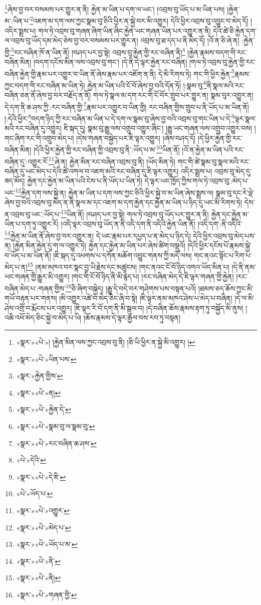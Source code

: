 \footnote{«སྣར་»«པེ་»། །རྐྱེན་མིན་ལས་ཀྱང་འབྲས་བུ་ནི། །ཅི་ཡི་ཕྱིར་ན་སྐྱེ་མི་འགྱུར། །}ཞེས་བྱ་བར་བསམས་པར་གྱུར་ན་ནི། རྐྱེན་མ་ཡིན་པ་དག་ལ་ཡང་། །འབྲས་བུ་ཡོད་པ་མ་ཡིན་པས། །རྐྱེན་མ་:ཡིན་པ་\footnote{«སྣར་»«པེ་»ཡིན་པས་}འཇག་མ་དག་ལས་ཀྱང་སྣམ་བུ་ཅིའི་ཕྱིར་ན་སྐྱེ་བར་མི་འགྱུར། དེའི་ཕྱིར་འབྲས་བུ་འབྱུང་བ་མེད་དོ། །འདིར་སྨྲས་པ། གལ་ཏེ་འབྲས་བུ་གཞན་ཞིག་ཡིན་ཞིང་རྐྱེན་ཡང་གཞན་ཡིན་པར་འགྱུར་ན་ནི། དེའི་ཚེ་ཅི་རྐྱེན་དག་ལ་འབྲས་བུ་ཡོད་དམ་མེད་ཅེས་བྱ་བར་བསམས་པར་གྱུར་ན། འབྲས་བུ་ཐ་དད་པ་ནི་མེད་དོ། །འོ་ན་ཅི་ཞེ་ན། :རྐྱེན་གྱི་\footnote{«སྣར་»རྐྱེན་གྱིས་}རང་བཞིན་ཁོ་ན་ཡིན་ནོ། །བཤད་པར་བྱ་སྟེ། འབྲས་བུ་རྐྱེན་གྱི་རང་བཞིན་ནི།\footnote{«སྣར་»«པེ་»ན།} །རྐྱེན་རྣམས་བདག་གི་རང་བཞིན་མིན། །བདག་དངོས་མིན་ལས་འབྲས་བུ་གང་། །དེ་ནི་དེ་ལྟར་རྐྱེན་རང་བཞིན། །གལ་ཏེ་འབྲས་བུ་རྐྱེན་གྱི་རང་བཞིན་རྐྱེན་གྱི་རྣམ་པར་འགྱུར་བ་ཡིན་ནོ་ཞེས་རྣམ་པར་འཇོག་ན་ནི། དེ་མི་རིགས་ཏེ། གང་གི་ཕྱིར་རྐྱེན་\footnote{«སྣར་»«པེ་»རྐྱེན་དེ་}རྣམས་ཀྱང་བདག་གི་རང་བཞིན་མ་ཡིན་ཏེ། རྐྱེན་མ་ཡིན་པའི་ངོ་བོ་ཞེས་བྱ་བའི་དོན་ཏོ། །:སྣམ་བུ་\footnote{«སྣར་»«པེ་»སྣམ་བུ་ལ་སྣམ་བུ་}ནི་སྣལ་མའི་རང་བཞིན་ཅན་ནོ་ཞེས་བྱ་བར་བརྗོད་ན་ནི། གལ་ཏེ་སྣལ་མ་དག་རང་གི་ངོ་བོར་གྲུབ་པར་གྱུར་ན། སྣམ་བུར་འགྱུར་ན། དེ་དག་ནི་ཆ་ཤས་ཀྱི་:རང་བཞིན་གྱི་\footnote{«སྣར་»«པེ་»རང་བཞིན་ཆ་ཤས་}རྣམ་པར་འགྱུར་བ་ཡིན་གྱི། རང་བཞིན་གྱིས་གྲུབ་པ་ནི་ཡོད་པ་མ་ཡིན་ནོ། །:དེའི་ཕྱིར་\footnote{«པེ་»དེའི་}བདག་ཉིད་ཀྱི་རང་བཞིན་མ་ཡིན་པ་དེ་དག་ལ་སྣམ་བུ་ཞེས་བྱ་བའི་འབྲས་བུ་གང་ཡིན་པ་དེ་\footnote{«སྣར་»«པེ་»དེ་ཇི་}ལྟར་སྣལ་མའི་རང་བཞིན་དུ་འགྱུར། ཇི་སྐད་དུ། སྣམ་བུ་རྒྱུ་ལས་འགྲུབ་འགྱུར་ཞིང་། །རྒྱུ་ཡང་གཞན་ལས་འགྲུབ་འགྱུར་བས། །གང་ཞིག་རང་གི་འགྲུབ་མེད་པ། །དེས་གཞན་བསྐྱེད་པར་ཇི་ལྟར་འགྱུར། །ཞེས་བཤད་དོ། །དེ་ཕྱིར་རྐྱེན་གྱི་རང་བཞིན་མིན། །དེའི་ཕྱིར་རྐྱེན་གྱི་རང་བཞིན་གྱི་འབྲས་བུ་ནི་:ཡོད་པ་མ་\footnote{«པེ་»ཡོད་པ་}ཡིན་ནོ། །འོ་ན་རྐྱེན་མ་ཡིན་པའི་རང་བཞིན་དུ་:འགྱུར་རོ་\footnote{«སྣར་»«པེ་»འགྱུར་}ཞེ་ན། རྐྱེན་མིན་རང་བཞིན་འབྲས་བུ་ནི། །ཡོད་མིན་ཏེ། གང་གི་ཚེ་སྣམ་བུ་སྣལ་མའི་རང་བཞིན་དུ་ཡང་མེད་པ་དེའི་ཚེ་འགལ་བ་འཇག་མའི་རང་བཞིན་དུ་ཇི་ལྟར་འགྱུར། འདིར་སྨྲས་པ། འབྲས་བུ་མེད་དུ་ཟད་མོད། རྐྱེན་དང་རྐྱེན་མ་ཡིན་པའི་ངེས་པ་ནི་ཡོད་པ་ཡིན་ཏེ། དེ་ལྟར་ཡང་ཁྱོད་ཀྱིས་གལ་ཏེ་འབྲས་བུ་:མེད་པ་ཡང་\footnote{«སྣར་»«པེ་»མེད་པ་}རྐྱེན་དག་ལས་སྐྱེ་ན། རྐྱེན་མ་ཡིན་པ་དག་ལས་ཀྱང་ཅིའི་ཕྱིར་སྐྱེ་བ་མ་ཡིན་ཞེས་སྨྲས་ལ། སྣམ་བུ་དང་རེ་ལྡེ་ཞེས་བྱ་བའི་འབྲས་བུ་མེད་ན་ནི་སྣལ་མ་དང་འཇག་མ་དག་རྐྱེན་དང་རྐྱེན་མ་ཡིན་པ་ཉིད་དུ་ཡང་མི་རིགས་ཏེ། དེས་ན་འབྲས་བུ་ཡང་:ཡོད་པ་\footnote{«སྣར་»«པེ་»ཡོད་པ་མ་}ཡིན་ནོ། །བཤད་པར་བྱ་སྟེ། གལ་ཏེ་འབྲས་བུ་ཡོད་པར་གྱུར་ན་ནི། རྐྱེན་དང་རྐྱེན་མ་ཡིན་པ་དག་ཏུ་འགྱུར་རོ། །འདི་ལྟར་འབྲས་བུ་ཡོད་ན་ནི་འདི་དག་ནི་འདིའི་རྐྱེན་ཡིན་ནོ། །འདི་དག་:ནི་འདིའི་\footnote{«སྣར་»«པེ་»ནི་}རྐྱེན་མ་ཡིན་ནོ་ཞེས་བྱ་བར་འགྱུར་ན། དེ་ཡང་རྣམ་པར་དཔྱད་པ་ན་མེད་པ་ཉིད་དེ། དེའི་ཕྱིར་འབྲས་བུ་མེད་པས་ན། །རྐྱེན་མིན་རྐྱེན་དུ་ག་ལ་འགྱུར་ཏེ། རྐྱེན་དང་རྐྱེན་མ་ཡིན་པར་ཞེས་ཚིག་བསྡུའོ། །དེའི་ཕྱིར་དངོས་པོ་རྣམས་སྐྱེ་བ་ཡོད་པ་མ་ཡིན་ནོ། །ཇི་སྐད་དུ་འཕགས་པ་དཀོན་མཆོག་འབྱུང་གནས་ཀྱི་མདོ་ལས། གང་ནའང་སྟོང་པ་རིག་པ་མེད་པ་ན།\footnote{«སྣར་»«པེ་»ནི།} །ནམ་མཁའ་བར་སྣང་བྱ་ཡི་རྗེས་དང་མཚུངས། །གང་ནའང་ངོ་བོ་ཉིད་འགའ་ཡོད་མིན་པ། །དེ་ནི་ནམ་ཡང་གཞན་གྱི་རྒྱུར་མི་འགྱུར། །གང་གི་ངོ་བོ་ཉིད་ནི་མི་རྙེད་པ། །རང་བཞིན་མེད་དེ་ཇི་ལྟར་གཞན་གྱི་རྐྱེན། །རང་བཞིན་མེད་པ་:གཞན་གྱིས་\footnote{«སྣར་»«པེ་»གཞན་གྱི་}ཅི་ཞིག་བསྐྱེད། །རྒྱུ་དེ་བདེ་བར་གཤེགས་པས་བསྟན་པའོ། །ཐམས་ཅད་ཆོས་ཀྱང་མི་གཡོ་བརྟན་པར་གནས། །མི་འགྱུར་འཚེ་བ་མེད་ཅིང་ཞི་བ་སྟེ། །ཇི་ལྟར་ནམ་མཁའ་ཤེས་པ་མེད་པ་བཞིན། །དེ་ལ་མི་ཤེས་འགྲོ་བ་རྨོངས་པར་འགྱུར། །ཇི་ལྟར་རི་བོ་དག་ནི་མི་སྒུལ་བ། །དེ་བཞིན་ཆོས་རྣམས་རྟག་ཏུ་བསྐྱོད་མི་ནུས། །འཆི་འཕོ་མེད་ཅིང་སྐྱེ་བ་མེད་པ་ཡི། །ཆོས་རྣམས་དེ་ལྟར་རྒྱལ་བས་རབ་ཏུ་བསྟན། 